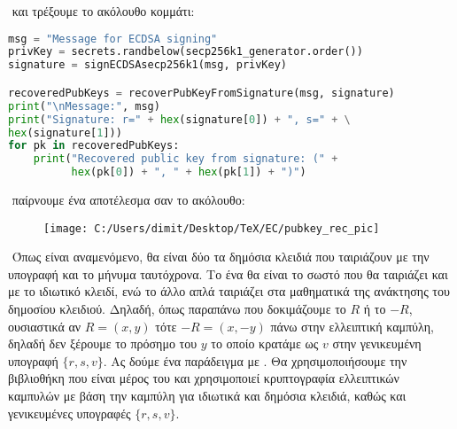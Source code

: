 \documentclass[oneside,a4paper]{article}
\begin{document}
$ $\newline
και τρέξουμε το ακόλουθο κομμάτι:

\vspace*{0.3cm}
\begin{lstlisting}[language=Python]
msg = "Message for ECDSA signing"
privKey = secrets.randbelow(secp256k1_generator.order())
signature = signECDSAsecp256k1(msg, privKey)

recoveredPubKeys = recoverPubKeyFromSignature(msg, signature)
print("\nMessage:", msg)
print("Signature: r=" + hex(signature[0]) + ", s=" + \
hex(signature[1]))
for pk in recoveredPubKeys:
    print("Recovered public key from signature: (" +
          hex(pk[0]) + ", " + hex(pk[1]) + ")")
\end{lstlisting}

$ $\newline
παίρνουμε ένα αποτέλεσμα σαν το ακόλουθο:

\vspace*{0.3cm}
\begin{figure}[H]
	\centering
	\texttt{[image: C:/Users/dimit/Desktop/TeX/EC/pubkey\_rec\_pic]}
\end{figure}

$ $\newline
Όπως είναι αναμενόμενο, θα είναι δύο τα δημόσια κλειδιά που ταιριάζουν με την υπογραφή και το μήνυμα ταυτόχρονα. Το ένα θα είναι το σωστό που θα ταιριάζει και με το ιδιωτικό κλειδί, ενώ το άλλο απλά ταιριάζει στα μαθηματικά της ανάκτησης του δημοσίου κλειδιού. Δηλαδή, όπως παραπάνω που δοκιμάζουμε το $R$ ή το $-R$, ουσιαστικά αν $R= (x,y)$ τότε $-R  =(x,-y)$ πάνω στην ελλειπτική καμπύλη, δηλαδή δεν ξέρουμε το πρόσημο του $y$ το οποίο κρατάμε ως $v$ στην γενικευμένη υπογραφή $\{r,s,v\}$. Ας δούμε ένα παράδειγμα με . Θα χρησιμοποιήσουμε την βιβλιοθήκη  που είναι μέρος του  και χρησιμοποιεί κρυπτογραφία ελλειπτικών καμπυλών με βάση την καμπύλη  για ιδιωτικά και δημόσια κλειδιά, καθώς και γενικευμένες  υπογραφές $\{r,s,v\}$.
\end{document}
